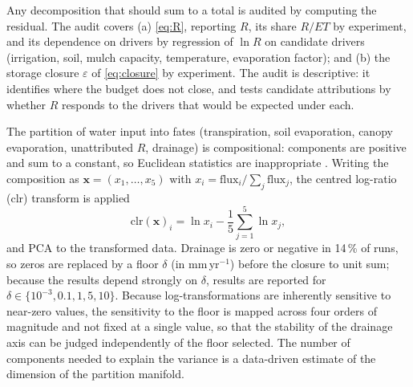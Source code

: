 Any decomposition that should sum to a total is audited by computing the residual. The audit covers (a) \cref{eq:R}, reporting $R$, its share $R/\mathit{ET}$ by experiment, and its dependence on drivers by regression of $\ln R$ on candidate drivers (irrigation, soil, mulch capacity, temperature, evaporation factor); and (b) the storage closure $\varepsilon$ of \cref{eq:closure} by experiment. The audit is descriptive: it identifies where the budget does not close, and tests candidate attributions by whether $R$ responds to the drivers that would be expected under each.

The partition of water input into fates (transpiration, soil evaporation, canopy evaporation, unattributed $R$, drainage) is compositional: components are positive and sum to a constant, so Euclidean statistics are inappropriate \citep{Aitchison1986,Egozcue2003}. Writing the composition as $\mathbf x=(x_1,\dots,x_5)$ with $x_i=\text{flux}_i/\sum_j\text{flux}_j$, the centred log-ratio (clr) transform is applied
\begin{equation}
\mathrm{clr}(\mathbf x)_i=\ln x_i-\frac1{5}\sum_{j=1}^5\ln x_j ,
\label{eq:clr}
\end{equation}
and PCA \citep{Wold1987} to the transformed data. Drainage is zero or negative in 14\,\% of runs, so zeros are replaced by a floor $\delta$ (in mm\,yr$^{-1}$) before the closure to unit sum; because the results depend strongly on $\delta$, results are reported for $\delta\in\{10^{-3},0.1,1,5,10\}$. Because log-transformations are inherently sensitive to near-zero values, the sensitivity to the floor is mapped across four orders of magnitude and not fixed at a single value, so that the stability of the drainage axis can be judged independently of the floor selected. The number of components needed to explain the variance is a data-driven estimate of the dimension of the partition manifold.

